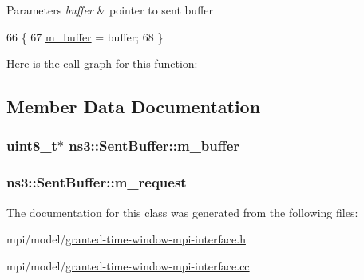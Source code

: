\begin{DoxyParams}{Parameters}
{\em buffer} & pointer to sent buffer \\
\hline
\end{DoxyParams}

\begin{DoxyCode}
66 \{
67   \hyperlink{classns3_1_1SentBuffer_a5dc66186a7909a1b28da55f367e33859}{m\_buffer} = buffer;
68 \}
\end{DoxyCode}


Here is the call graph for this function\+:




\subsection{Member Data Documentation}
\subsubsection[{\texorpdfstring{m\+\_\+buffer}{m_buffer}}]{\setlength{\rightskip}{0pt plus 5cm}uint8\+\_\+t$\ast$ ns3\+::\+Sent\+Buffer\+::m\+\_\+buffer\hspace{0.3cm}{\ttfamily [private]}}\hypertarget{classns3_1_1SentBuffer_a5dc66186a7909a1b28da55f367e33859}{}\label{classns3_1_1SentBuffer_a5dc66186a7909a1b28da55f367e33859}
\subsubsection[{\texorpdfstring{m\+\_\+request}{m_request}}]{ ns3\+::\+Sent\+Buffer\+::m\+\_\+request\hspace{0.3cm}{\ttfamily [private]}}\hypertarget{classns3_1_1SentBuffer_a092b3d662227c302e2dba47a29383497}{}\label{classns3_1_1SentBuffer_a092b3d662227c302e2dba47a29383497}


The documentation for this class was generated from the following files\+:\begin{DoxyCompactItemize}
\item 
mpi/model/\hyperlink{granted-time-window-mpi-interface_8h}{granted-\/time-\/window-\/mpi-\/interface.\+h}\item 
mpi/model/\hyperlink{granted-time-window-mpi-interface_8cc}{granted-\/time-\/window-\/mpi-\/interface.\+cc}\end{DoxyCompactItemize}
